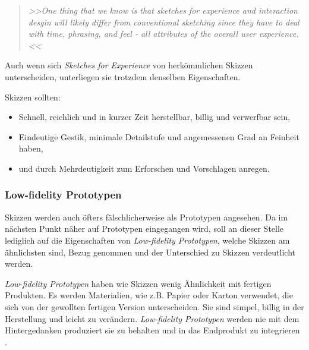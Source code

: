\begin{quote}
	\textsl{>>One thing that we know is that sketches for experience and interaction desgin will likely differ from conventional sketching since they have to deal with time, phrasing, and feel - all attributes of the overall user experience.<<}
\begin{flushright}\citep{Buxton:2007}\end{flushright}
\end{quote}

Auch wenn sich \emph{Sketches for Experience} von herkömmlichen Skizzen unterscheiden, unterliegen sie trotzdem denselben Eigenschaften.

\medskip Skizzen sollten:
\begin{itemize}
	\item Schnell, reichlich und in kurzer Zeit herstellbar, billig und verwerfbar sein,
	\item Eindeutige Gestik, minimale Detailstufe und angemessenen Grad an Feinheit haben,
	\item und durch Mehrdeutigkeit zum Erforschen und Vorschlagen anregen.
\end{itemize}
\begin{flushright}\citep{Buxton:2007}\end{flushright}

\subsubsection{Low-fidelity Prototypen} Skizzen werden auch öfters fälschlicherweise als Prototypen angesehen. Da im nächsten Punkt näher auf Prototypen eingegangen wird, soll an dieser Stelle lediglich auf die Eigenschaften von \emph{Low-fidelity Prototypen}, welche Skizzen am ähnlichsten sind, Bezug genommen und der Unterschied zu Skizzen verdeutlicht werden.

\medskip \emph{Low-fidelity Prototypen} haben wie Skizzen wenig Ähnlichkeit mit fertigen Produkten. Es werden Materialien, wie z.B. Papier oder Karton verwendet, die sich von der gewollten fertigen Version unterscheiden. Sie sind simpel, billig in der Herstellung und leicht zu verändern. \emph{Low-fidelity Prototypen} werden nie mit dem Hintergedanken produziert sie zu behalten und in das Endprodukt zu integrieren \citep{Sharp:2002}.

